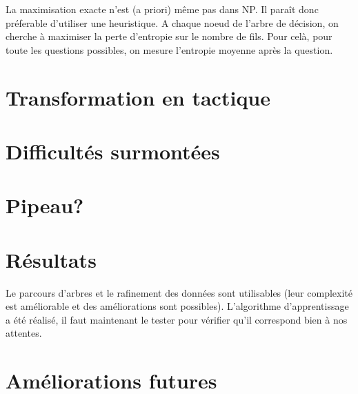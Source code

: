 La maximisation exacte n'est (a priori) même pas dans NP. Il paraît donc préferable d'utiliser une heuristique. A chaque noeud de l'arbre de décision, on cherche à maximiser la perte d'entropie sur le nombre de fils. Pour celà, pour toute les questions possibles, on mesure l'entropie moyenne après la question.


\section{Transformation en tactique}

\section{Difficultés surmontées}

\section{Pipeau?}

\section{Résultats}
Le parcours d'arbres et le rafinement des données sont utilisables (leur complexité est améliorable et des améliorations sont possibles).
 L'algorithme d'apprentissage a été réalisé, il faut maintenant le tester pour vérifier qu'il correspond bien à nos attentes.

\section{Améliorations futures}
